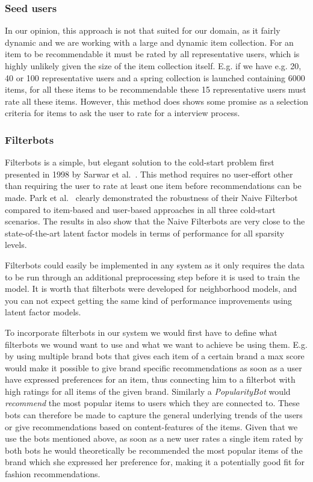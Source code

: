 \subsubsection{Seed users}

In our opinion, this approach is not that suited for our domain, as it fairly
dynamic and we are working with a large and dynamic item collection. For an item to be
recommendable it must be rated by all representative users, which is highly
unlikely given the size of the item collection itself. E.g. if we have e.g. 20, 40 or 100
representative users and a spring collection is launched containing 6000 items,
for all these items to be recommendable these 15 representative users must rate
all these items. However, this method does shows some promise as a selection criteria
for items to ask the user to rate for a interview process.

\subsubsection{Filterbots}

Filterbots is a simple, but elegant solution to the cold-start problem first
presented in 1998 by Sarwar et al.~\cite{sarwar1998using}. This method
requires no user-effort other than requiring the user to rate at least one
item before recommendations can be made.
Park et al.~\cite{Park2006} clearly demonstrated the robustness of their Naive
Filterbot compared to item-based and user-based approaches in all three
cold-start scenarios. The results in \cite{Agarwal2009, Agarwal2010} also show
that the Naive Filterbots are very close to the state-of-the-art
latent factor models in terms of performance for all sparsity levels.

Filterbots could easily be implemented in any system as it only requires
the data to be run through an additional preprocessing step before it
is used to train the model. It is worth that filterbots were developed
for neighborhood models, and you can not expect getting the same kind
of performance improvements using latent factor models.

To incorporate filterbots in our system we would first have to define what filterbots
we wound want to use and what we want to achieve be using them. E.g. by using multiple
brand bots that gives each item of a certain brand a max score would make it possible to give brand specific
recommendations as soon as a user have expressed preferences for an item, thus connecting
him to a filterbot with high ratings for all items of the given brand. Similarly
a \emph{PopularityBot} would \emph{recommend} the most popular items to users which
they are connected to. These bots can therefore be made to capture the general underlying
trends of the users or give recommendations based on content-features of the items.
Given that we use the bots mentioned above, as soon as a new user rates a single item
rated by both bots he would theoretically be recommended the most popular items of
the brand which she expressed her preference for, making it a potentially good fit for fashion
recommendations.

